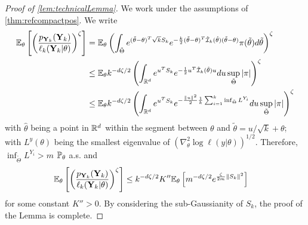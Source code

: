 \begin{proof}[Proof of \cref{lem:technicalLemma}]
    We work under the assumptions of \cref{thm:refcompactpos}.
    We write 
    \begin{align}
    \nonumber
 \mathbb{E}_\theta\left[\left( \frac{p_{\mathbf{Y}_k}(\mathbf{Y}_k)}{\ell_k(\mathbf{Y}_k |\theta)} \right)^\zeta\right] 
            &= \mathbb{E}_\theta \left(\int_{\tilde\Theta} e^{(\tilde\theta-\theta)^T\sqrt{k}S_k} e^{-\frac{k}{2}(\tilde\theta-\theta)^T\hat{\mathcal{I}}_k(\hat\theta)(\tilde\theta-\theta)}\pi(\tilde\theta)d\tilde\theta \right)^\zeta \\
\nonumber            &\leq\mathbb{E}_\theta k^{-d\zeta/2}\left(\int_{\mathbb{R}^d}  e^{u^TS_k} e^{-\frac{1}{2}u^T\hat{\mathcal{I}}_k(\hat\theta)u} du \sup_{\tilde\Theta}|\pi| \right)^\zeta \\
   &\leq\mathbb{E}_\theta k^{-d\zeta/2}\left(\int_{\mathbb{R}^d} e^{u^TS_k} e^{-\frac{\|u\|^2}{2}\frac{1}{k}\sum_{i=1}^k\inf_{\tilde\Theta} L^{Y_i}} du \sup_{\tilde\Theta}|\pi| \right)^\zeta
    \end{align}
with $\hat\theta$ being a point in $\mathbb{R}^d$ within the segment between $\theta$ and $\tilde\theta=u/\sqrt{k}+\theta$; with $L^y(\theta)$ being the smallest eigenvalue of $(\nabla^2_\theta\log\ell(y|\theta) )^{1/2}$.
Therefore, $\inf_{\tilde\Theta} L^{Y_i}>m$ $\mathbb{P}_\theta$ a.s. and 
    \begin{align}
        \mathbb{E}_\theta\left[\left( \frac{p_{\mathbf{Y}_k}(\mathbf{Y}_k)}{\ell_k(\mathbf{Y}_k |\theta)} \right)^\zeta\right] 
            &\leq k^{-d\zeta/2}K''\mathbb{E}_\theta\left[m^{-d\zeta/2}e^{\frac{\zeta }{2m}\|S_k\|^2}\right]
    \end{align}    
for some constant $K''>0$. {By considering the sub-Gaussianity of $S_k$, the proof of the Lemma is complete.}

\end{proof}

